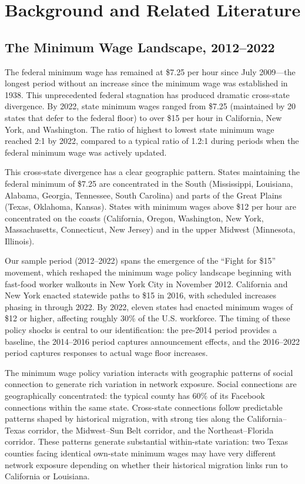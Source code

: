 \documentclass[12pt]{article}
\begin{document}
\section{Background and Related Literature}
\label{sec:background}

\subsection{The Minimum Wage Landscape, 2012--2022}

The federal minimum wage has remained at \$7.25 per hour since July 2009---the longest period without an increase since the minimum wage was established in 1938. This unprecedented federal stagnation has produced dramatic cross-state divergence. By 2022, state minimum wages ranged from \$7.25 (maintained by 20 states that defer to the federal floor) to over \$15 per hour in California, New York, and Washington. The ratio of highest to lowest state minimum wage reached 2:1 by 2022, compared to a typical ratio of 1.2:1 during periods when the federal minimum wage was actively updated.

This cross-state divergence has a clear geographic pattern. States maintaining the federal minimum of \$7.25 are concentrated in the South (Mississippi, Louisiana, Alabama, Georgia, Tennessee, South Carolina) and parts of the Great Plains (Texas, Oklahoma, Kansas). States with minimum wages above \$12 per hour are concentrated on the coasts (California, Oregon, Washington, New York, Massachusetts, Connecticut, New Jersey) and in the upper Midwest (Minnesota, Illinois).

Our sample period (2012--2022) spans the emergence of the ``Fight for \$15'' movement, which reshaped the minimum wage policy landscape beginning with fast-food worker walkouts in New York City in November 2012. California and New York enacted statewide paths to \$15 in 2016, with scheduled increases phasing in through 2022. By 2022, eleven states had enacted minimum wages of \$12 or higher, affecting roughly 30\% of the U.S. workforce. The timing of these policy shocks is central to our identification: the pre-2014 period provides a baseline, the 2014--2016 period captures announcement effects, and the 2016--2022 period captures responses to actual wage floor increases.

The minimum wage policy variation interacts with geographic patterns of social connection to generate rich variation in network exposure. Social connections are geographically concentrated: the typical county has 60\% of its Facebook connections within the same state. Cross-state connections follow predictable patterns shaped by historical migration, with strong ties along the California--Texas corridor, the Midwest--Sun Belt corridor, and the Northeast--Florida corridor. These patterns generate substantial within-state variation: two Texas counties facing identical own-state minimum wages may have very different network exposure depending on whether their historical migration links run to California or Louisiana.
\end{document}
